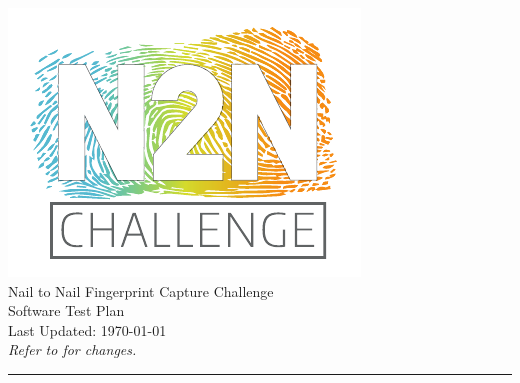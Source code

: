 \begin{center}
	\includegraphics{../assets/n2n_logo_white}\\
	\LARGE{Nail to Nail Fingerprint Capture Challenge}\\
	\Large{Software Test Plan}\\[2ex]
	\small{Last Updated: \today{}}
	\\\footnotesize{\textit{Refer to  for changes.}}
	\\[2ex]
\end{center}

\hrule

\tableofcontents

